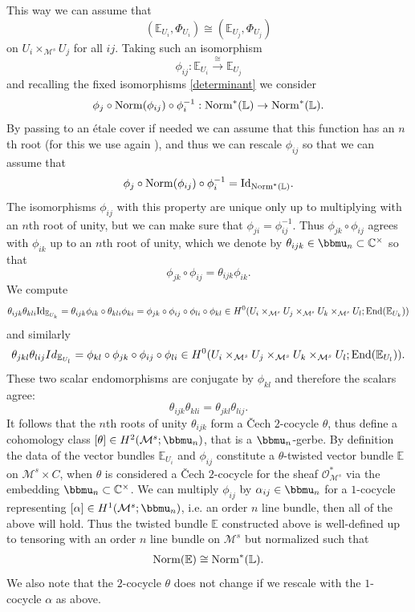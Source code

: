 \documentclass[12pt]{article}
\numberwithin{equation}{section}
\theoremstyle{remark}
\theoremstyle{definition}
\numberwithin{theorem}{section}
\def\beq{\begin{eqnarray}}
\def\eeq{\end{eqnarray}}
\def\bP{{\mathbb P}}
\def\muhat{{\bbmu}}
\def\nm{{\mathit Norm}}
\def\Nm{{\rm Norm}}
\def\bE{{\mathbb{E}}}
\def\bPhi{{\mathbb{\Phi}}}
\def\L{\mathbb{L}}
\def\C{\mathbb{C}}
\def\M{{\mathcal{M}}}
\def\calO{{\mathcal O}}
\newcommand{\End}{\textnormal{End}}
\renewcommand{\1}{\mathbbm{1}}
\begin{document}
This way we can assume that $$(\bE_{U_i},\bPhi_{U_i})\cong (\bE_{U_j},\bPhi_{U_j})$$ on $U_i\times_{\M^s} U_j$ for all ${ij}$. Taking such an isomorphism $$\phi_{ij}: \bE_{U_i} \stackrel{\cong}{\to} \bE_{U_j}$$ and recalling the fixed isomorphisms \eqref{determinant} we consider $$\phi_j\circ \Nm(\phi_{ij}) \circ \phi_i^{-1}:\Nm^*(\L)\to \Nm^*(\L).$$ By passing to an \'etale cover if needed we can assume that this function has an $n$th root (for this we use again \cite[Theorem 4.1]{artin}), and thus we can rescale $\phi_{ij}$ so that we can assume that $$\phi_j\circ \Nm(\phi_{ij}) \circ \phi_i^{-1}={\mathrm{Id}}_{\Nm^*(\L)}.$$ The isomorphisms $\phi_{ij}$ with this property are unique only up to multiplying with an $n$th root of unity, but we can make sure that $\phi_{ji}=\phi_{ij}^{-1}$.  
Thus $\phi_{jk}\circ\phi_{ij}$ agrees with $\phi_{ik}$ up to an $n$th root of unity, which we denote by $\theta_{ijk}\in \bbmu_n\subset \C^\times$ so that $$\phi_{jk}\circ\phi_{ij}=\theta_{ijk}\phi_{ik}.$$
We compute $$\theta_{ijk} \theta_{kli}{\mathrm{Id}}_{\bE_{U_k}}= \theta_{ijk}\phi_{ik}\circ \theta_{kli}\phi_{ki}=\phi_{jk}\circ\phi_{ij}\circ \phi_{li}\circ\phi_{kl}\in H^0(U_i\times_{\M^s}U_j\times_{\M^s}U_k\times_{\M^s}U_l;\End(\bE_{U_k}))$$ and similarly  
$$\theta_{jkl} \theta_{lij}Id_{\bE_{U_l}}= \phi_{kl}\circ\phi_{jk}\circ \phi_{ij}\circ\phi_{li}\in H^0(U_i\times_{\M^s}U_j\times_{\M^s}U_k\times_{\M^s}U_l;\End(\bE_{U_l})).$$ 
These two scalar endomorphisms are conjugate by $\phi_{kl}$ and therefore the scalars agree: $$\theta_{ijk} \theta_{kli}=\theta_{jkl} \theta_{lij}.$$ It follows that the $n$th roots of unity $\theta_{ijk}$ form a {\v{C}}ech $2$-cocycle $\theta$, thus define a cohomology class $[\theta]\in H^2(\M^s;\muhat_n)$, that is a $\muhat_n$-gerbe. By definition \cite[\S 1.2]{caldararu} the data of the vector bundles $\bE_{U_i}$ and  $\phi_{ij}$ constitute a $\theta$-twisted vector bundle $\bE$ on $\M^s\times C$, when $\theta$ is considered a  \v{C}ech $2$-cocycle for the sheaf $\calO_{\M^s}^*$ via the embedding $\bbmu_n\subset \C^\times$. We can multiply $\phi_{ij}$ by $\alpha_{ij}\in \muhat_n$ for a $1$-cocycle representing $[\alpha] \in H^1(\M^s; \bbmu_n)$, i.e. an order $n$ line bundle, then all of the above will hold. Thus the twisted bundle $\bE$ constructed above  is well-defined up to tensoring with an order $n$ line bundle on $\M^s$  but normalized such that \beq\label{normalise}\Nm(\bE)\cong \Nm^*(\L).\eeq We also note that the $2$-cocycle $\theta$ does not change if we rescale with the $1$- cocycle $\alpha$ as above. %
\end{document}
